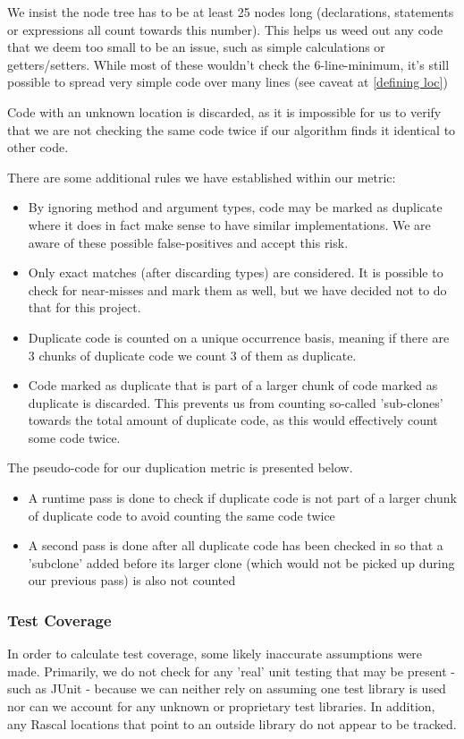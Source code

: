 \documentclass{article}
\begin{document}
We insist the node tree has to be at least 25 nodes long (declarations, statements or expressions all count towards this number). This helps us weed out any code that we deem too small to be an issue, such as simple calculations or getters/setters. While most of these wouldn't check the 6-line-minimum, it's still possible to spread very simple code over many lines (see caveat at \ref{defining loc})

Code with an unknown location is discarded, as it is impossible for us to verify that we are not checking the same code twice if our algorithm finds it identical to other code.

There are some additional rules we have established within our metric:
\begin{itemize}
\item By ignoring method and argument types, code may be marked as duplicate where it does in fact make sense to have similar implementations. We are aware of these possible false-positives and accept this risk.
\item Only exact matches (after discarding types) are considered. It is possible to check for near-misses and mark them as well, but we have decided not to do that for this project.
\item Duplicate code is counted on a unique occurrence basis, meaning if there are 3 chunks of duplicate code we count 3 of them as duplicate.
\item Code marked as duplicate that is part of a larger chunk of code marked as duplicate is discarded. This prevents us from counting so-called 'sub-clones' towards the total amount of duplicate code, as this would effectively count some code twice.
\end{itemize}

The pseudo-code for our duplication metric is presented below.

\begin{itemize}
\item A runtime pass is done to check if duplicate code is not part of a larger chunk of duplicate code to avoid counting the same code twice
\item A second pass is done after all duplicate code has been checked in so that a 'subclone' added before its larger clone (which would not be picked up during our previous pass) is also not counted
\end{itemize}

\subsubsection{Test Coverage} \label{assumetests}
In order to calculate test coverage, some likely inaccurate assumptions were made.
Primarily, we do not check for any 'real' unit testing that may be present - such as JUnit - because we can neither rely on assuming one test library is used nor can we account for any unknown or proprietary test libraries. In addition, any Rascal locations that point to an outside library do not appear to be tracked.
\end{document}
